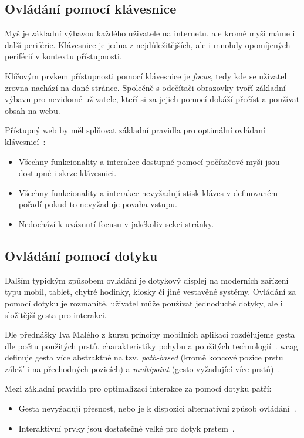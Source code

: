 \subsection{Ovládání pomocí klávesnice}

Myš je základní výbavou každého uživatele na internetu, ale kromě myši máme i další periférie.
Klávesnice je jedna z nejdůležitějších, ale i mnohdy opomíjených periférií v kontextu přístupnosti.

Klíčovým prvkem přístupnosti pomocí klávesnice je \textit{focus}, tedy kde se uživatel zrovna nachází na dané stránce.
Společně s odečítači obrazovky tvoří základní výbavu pro nevidomé uživatele, kteří si za jejich pomocí dokáží přečíst a používat obsah na webu.

Přístupný web by měl splňovat základní pravidla pro optimální ovládaní klávesnicí~\cite{wcag-keyboard}:

\begin{itemize}
  \item Všechny funkcionality a interakce dostupné pomocí počítačové myši jsou dostupné i skrze klávesnici.
  \item Všechny funkcionality a interakce nevyžadují stisk kláves v definovaném pořadí pokud to nevyžaduje povaha vstupu.
  \item Nedochází k uváznutí focusu v jakékoliv sekci stránky.
\end{itemize}

\subsection{Ovládání pomocí dotyku}

Dalším typickým způsobem ovládání je dotykový displej na moderních zařízení typu mobil, tablet, chytré hodinky, kiosky či jiné vestavěné systémy.
Ovládání za pomocí dotyku je rozmanité, uživatel může používat jednoduché dotyky, ale i složitější gesta pro interakci.

Dle přednášky Iva Malého z kurzu principy mobilních aplikací rozdělujeme gesta dle počtu použitých prstů, charakteristiky pohybu a použitých technologií~\cite{ctu-pda-11}.
\gls{wcag} definuje gesta více abstraktně na tzv. \textit{path-based} (kromě koncové pozice prstu záleží i na přechodných pozicích) a \textit{multipoint} (gesto vyžadující více prstů)~\cite{wcag-pointer-gestures}.

Mezi základní pravidla pro optimalizaci interakce za pomocí dotyku patří:

\begin{itemize}
  \item Gesta nevyžadují přesnost, nebo je k dispozici alternativní způsob ovládání~\cite{wcag-pointer-gestures}.
  \item Interaktivní prvky jsou dostatečně velké pro dotyk prstem~\cite{wcag-target-size}.
\end{itemize}

